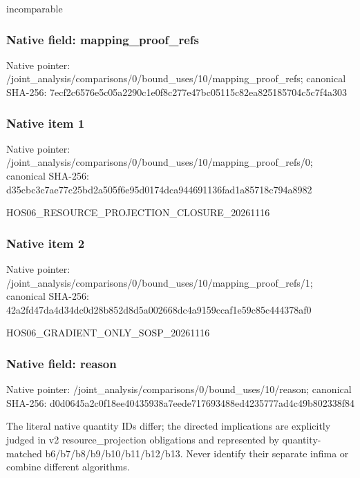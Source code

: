 \documentclass[10pt,a4paper]{article}
\begin{document}
\begingroup\raggedright\sloppy incomparable\par\endgroup

\subsubsection{Native field: mapping\_\allowbreak{}proof\_\allowbreak{}refs}
Native pointer: /joint\_\allowbreak{}analysis/comparisons/0/bound\_\allowbreak{}uses/10/mapping\_\allowbreak{}proof\_\allowbreak{}refs; canonical SHA-256: 7ecf2c6576e5c05a2290c1e0f8c277e47bc05115c82ea825185704c5c7f4a303

\subsubsection{Native item 1}
Native pointer: /joint\_\allowbreak{}analysis/comparisons/0/bound\_\allowbreak{}uses/10/mapping\_\allowbreak{}proof\_\allowbreak{}refs/0; canonical SHA-256: d35cbc3c7ae77c25bd2a505f6e95d0174dca944691136fad1a85718c794a8982

\begingroup\raggedright\sloppy HOS06\_\allowbreak{}RESOURCE\_\allowbreak{}PROJECTION\_\allowbreak{}CLOSURE\_\allowbreak{}20261116\par\endgroup

\subsubsection{Native item 2}
Native pointer: /joint\_\allowbreak{}analysis/comparisons/0/bound\_\allowbreak{}uses/10/mapping\_\allowbreak{}proof\_\allowbreak{}refs/1; canonical SHA-256: 42a2fd47da4d34dc0d28b852d8d5a002668dc4a9159ccaf1e59c85c444378af0

\begingroup\raggedright\sloppy HOS06\_\allowbreak{}GRADIENT\_\allowbreak{}ONLY\_\allowbreak{}SOSP\_\allowbreak{}20261116\par\endgroup

\subsubsection{Native field: reason}
Native pointer: /joint\_\allowbreak{}analysis/comparisons/0/bound\_\allowbreak{}uses/10/reason; canonical SHA-256: d0d0645a2c0f18ee40435938a7eede717693488ed4235777ad4c49b802338f84

\begingroup\raggedright\sloppy The literal native quantity IDs differ;\allowbreak{} the directed implications are explicitly judged in v2 resource\_\allowbreak{}projection obligations and represented by quantity-matched b6/\allowbreak{}b7/\allowbreak{}b8/\allowbreak{}b9/\allowbreak{}b10/\allowbreak{}b11/\allowbreak{}b12/\allowbreak{}b13. Never identify their separate infima or combine different algorithms.\par\endgroup
\end{document}
